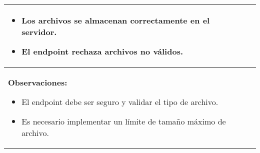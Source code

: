 \begin{table}[H]
\begin{center}
\begin{tabularx}{\textwidth}{|l|X|l|}
{\begin{itemize}
                    \item Los archivos se almacenan correctamente en el servidor.
                    \item El endpoint rechaza archivos no válidos.
                \end{itemize}
            }\\
            \hline
            \multicolumn{3}{|p{\textwidth}|}{
                \textbf{Observaciones:}
                \begin{itemize}
                    \item El endpoint debe ser seguro y validar el tipo de archivo.
                    \item Es necesario implementar un límite de tamaño máximo de archivo.
                \end{itemize}
            }\\
            \hline
        \end{tabularx}
    \end{center}
\end{table}

